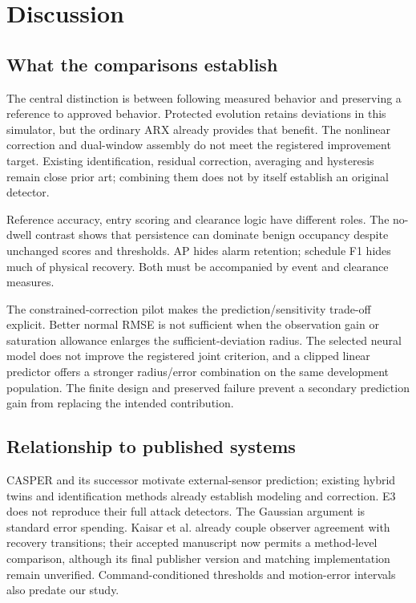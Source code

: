 \section{Discussion}\label{sec:discussion}
\subsection{What the comparisons establish}
The central distinction is between following measured behavior and preserving a reference to approved behavior. Protected evolution retains deviations in this simulator, but the ordinary ARX already provides that benefit. The nonlinear correction and dual-window assembly do not meet the registered improvement target. Existing identification, residual correction, averaging and hysteresis remain close prior art; combining them does not by itself establish an original detector.

Reference accuracy, entry scoring and clearance logic have different roles. The no-dwell contrast shows that persistence can dominate benign occupancy despite unchanged scores and thresholds. AP hides alarm retention; schedule F1 hides much of physical recovery. Both must be accompanied by event and clearance measures.

The constrained-correction pilot makes the prediction/sensitivity trade-off explicit. Better normal RMSE is not sufficient when the observation gain or saturation allowance enlarges the sufficient-deviation radius. The selected neural model does not improve the registered joint criterion, and a clipped linear predictor offers a stronger radius/error combination on the same development population. The finite design and preserved failure prevent a secondary prediction gain from replacing the intended contribution.

\subsection{Relationship to published systems}
CASPER and its successor motivate external-sensor prediction; existing hybrid twins and identification methods already establish modeling and correction. E3 does not reproduce their full attack detectors. The Gaussian argument is standard error spending. Kaisar et al. already couple observer agreement with recovery transitions; their accepted manuscript now permits a method-level comparison, although its final publisher version and matching implementation remain unverified. Command-conditioned thresholds and motion-error intervals also predate our study.

